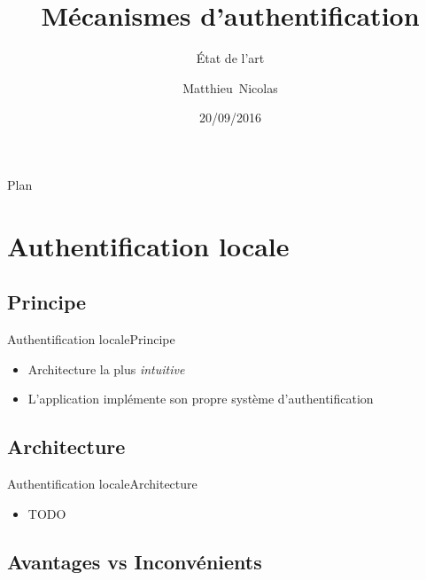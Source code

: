 \documentclass{beamer}
\title{Mécanismes d'authentification}
\subtitle{État de l'art}
\author{Matthieu~Nicolas}
\date{20/09/2016}
\begin{document}
\begin{frame}
  \titlepage
\end{frame}

\begin{frame}{Plan}
  \tableofcontents
\end{frame}

\section{Authentification locale}

\subsection{Principe}

\begin{frame}{Authentification locale}{Principe}
  \begin{center}
    \begin{itemize}
      \item Architecture la plus \emph{intuitive}
      \item L'application implémente son propre système d'authentification
    \end{itemize}
  \end{center}
\end{frame}

\subsection{Architecture}

\begin{frame}{Authentification locale}{Architecture}
  \begin{itemize}
    \item TODO
  \end{itemize}
\end{frame}

\subsection{Avantages vs Inconvénients}
\end{document}
